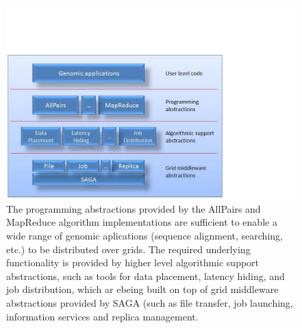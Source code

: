 \documentclass[a4paper,10pt]{article}
\begin{document}


\begin{figure}
\begin{center}
\includegraphics[scale=0.60]{data_intensive_app_saga}
\end{center}
\caption{The programming abstractions provided by the AllPairs and
  MapReduce algorithm implementations are sufficient to enable a wide
  range of genomic aplications (sequence alignment, searching, etc.)
  to be distributed over grids. The required underlying functionality
  is provided by higher level algorithmic support abstractions, such
  as tools for data placement, latency hiding, and job distribution,
  which ar ebeing built on top of grid middleware abstractions
  provided by SAGA (such as file transfer, job launching, information
  services and replica management.}
\label{fig:data_intensive_app_saga}
\end{figure}

 

\end{document}
